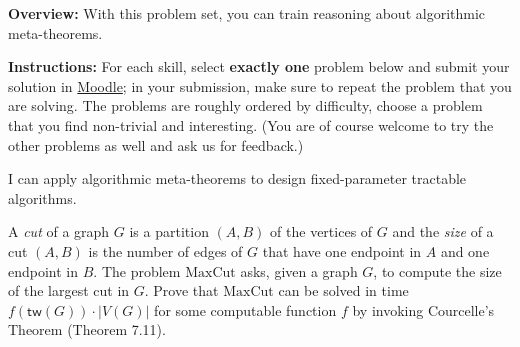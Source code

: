 \documentclass{uebung_cs}
\begin{document}
\textbf{Overview:} With this problem set, you can train reasoning about algorithmic meta-theorems.

\textbf{Instructions:} For each skill, select \textbf{exactly one} problem below and submit your solution in \href{https://moodle.studiumdigitale.uni-frankfurt.de/moodle/course/view.php?id=6259}{Moodle}; in your submission, make sure to repeat the problem that you are solving.
The problems are roughly ordered by difficulty, choose a problem that you find non-trivial and interesting. (You are of course welcome to try the other problems as well and ask us for feedback.)



\begin{skill}
  I can apply algorithmic meta-theorems to design fixed-parameter tractable algorithms.
\end{skill}

\begin{exercise}
  A \emph{cut} of a graph $G$ is a partition $(A,B)$ of the vertices of $G$ and the \emph{size} of a cut $(A,B)$ is the number of edges of $G$ that have one endpoint in $A$ and one endpoint in $B$. The problem $\mathrm{MaxCut}$ asks, given a graph $G$, to compute the size of the largest cut in $G$. Prove that $\mathrm{MaxCut}$ can be solved in time $f(\mathsf{tw}(G)) \cdot |V(G)|$ for some computable function $f$ by invoking Courcelle's Theorem (Theorem 7.11).
\end{exercise}
\end{document}
